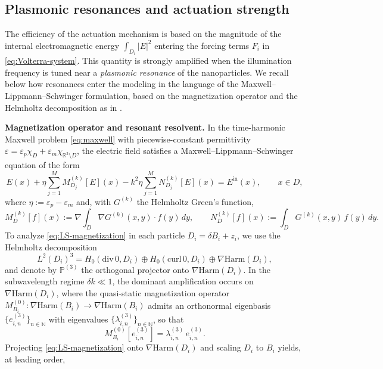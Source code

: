 \documentclass[11pt,a4paper]{article}
\numberwithin{equation}{section}
\theoremstyle{definition}
\newcommand{\R}{\mathbb{R}}
\newcommand{\eps}{\varepsilon}
\newcommand{\1}{\mathbbm{1}}
\begin{document}
\subsection{Plasmonic resonances and actuation strength}
\label{subsec:plasmonic-resonances}
\noindent
The efficiency of the actuation mechanism is based on the magnitude of the internal
electromagnetic energy $\int_{D_i}|E|^2$ entering the forcing terms $F_i$ in
\eqref{eq:Volterra-system}. This quantity is strongly amplified when the
illumination frequency is tuned near a \emph{plasmonic resonance} of the nanoparticles.
We recall below how resonances enter the modeling in the language of the
Maxwell--Lippmann--Schwinger formulation, based on the magnetization operator and
the Helmholtz decomposition as in \cite{CaoMukherjeeSini2025}.

\medskip
\noindent
\textbf{Magnetization operator and resonant resolvent.}
In the time-harmonic Maxwell problem \eqref{eq:maxwell} with piecewise-constant
permittivity $\eps=\eps_p\chi_D+\eps_m\chi_{\R^3\setminus D}$, the electric field
satisfies a Maxwell--Lippmann--Schwinger equation of the form
\begin{equation}
\label{eq:LS-magnetization}
E(x) + \eta \sum_{j=1}^M M^{(k)}_{D_j}[E](x) - k^2\eta \sum_{j=1}^M N^{(k)}_{D_j}[E](x) = E^{\mathrm{in}}(x),
\qquad x\in D,
\end{equation}
where $\eta:=\eps_p-\eps_m$ and, with $G^{(k)}$ the Helmholtz Green's function,
\[
M^{(k)}_{D}[f](x):=\nabla \int_D \nabla G^{(k)}(x,y)\cdot f(y)\,dy,
\qquad
N^{(k)}_{D}[f](x):=\int_D G^{(k)}(x,y)\, f(y)\,dy.
\]
To analyze \eqref{eq:LS-magnetization} in each particle $D_i=\delta B_i+z_i$, we use
the Helmholtz decomposition
\begin{equation}
\label{eq:Helmholtz-decomp}
L^2(D_i)^3=H_0(\mathrm{div}\,0,D_i)\oplus H_0(\mathrm{curl}\,0,D_i)\oplus \nabla \mathrm{Harm}(D_i),
\end{equation}
and denote by $\mathbb P^{(3)}$ the orthogonal projector onto $\nabla\mathrm{Harm}(D_i)$.
In the subwavelength regime $\delta k\ll 1$, the dominant amplification occurs on
$\nabla\mathrm{Harm}(D_i)$, where the quasi-static magnetization operator
$M^{(0)}_{B_i}:\nabla\mathrm{Harm}(B_i)\to\nabla\mathrm{Harm}(B_i)$ admits an
orthonormal eigenbasis $\{e^{(3)}_{i,n}\}_{n\in\mathbb N}$ with eigenvalues
$\{\lambda^{(3)}_{i,n}\}_{n\in\mathbb N}$, so that
\[
M^{(0)}_{B_i}[e^{(3)}_{i,n}] = \lambda^{(3)}_{i,n}\, e^{(3)}_{i,n}.
\]
Projecting \eqref{eq:LS-magnetization} onto $\nabla\mathrm{Harm}(D_i)$ and scaling
$D_i$ to $B_i$ yields, at leading order,
\end{document}
